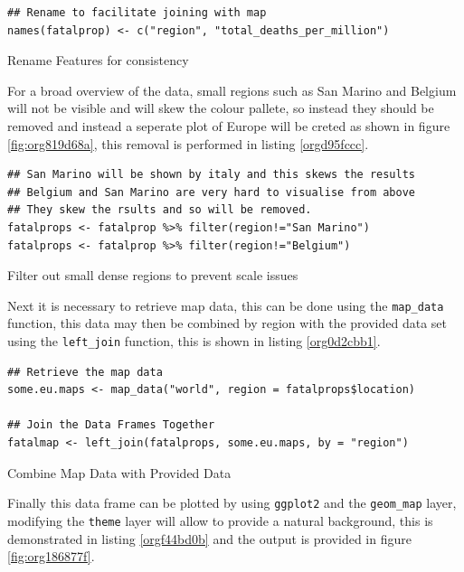 \documentclass[11pt]{article}
\begin{document}
\begin{listing}[htbp]
\begin{verbatim}
## Rename to facilitate joining with map
names(fatalprop) <- c("region", "total_deaths_per_million")
\end{verbatim}
\caption{\label{org26e6ca5}Rename Features for consistency}
\end{listing}

For a broad overview of the data, small regions such as San Marino and Belgium
will not be visible and will skew the colour pallete, so instead they should be removed
and instead a seperate plot of Europe will be creted as shown in figure \ref{fig:org819d68a}, this removal is performed in
listing \ref{orgd95fccc}.

\begin{listing}[htbp]
\begin{verbatim}
## San Marino will be shown by italy and this skews the results
## Belgium and San Marino are very hard to visualise from above
## They skew the rsults and so will be removed.
fatalprops <- fatalprop %>% filter(region!="San Marino")
fatalprops <- fatalprop %>% filter(region!="Belgium")
\end{verbatim}
\caption{\label{orgd95fccc}Filter out small dense regions to prevent scale issues}
\end{listing}


Next it is necessary to retrieve map data, this can be done using the \texttt{map\_data}
function, this data may then be combined by region with the provided data set
using the \texttt{left\_join} function, this is shown in listing \ref{org0d2cbb1}.

\begin{listing}[htbp]
\begin{verbatim}
## Retrieve the map data
some.eu.maps <- map_data("world", region = fatalprops$location)

## Join the Data Frames Together
fatalmap <- left_join(fatalprops, some.eu.maps, by = "region")
\end{verbatim}
\caption{\label{org0d2cbb1}Combine Map Data with Provided Data}
\end{listing}

Finally this data frame can be plotted by using \texttt{ggplot2} and the \texttt{geom\_map}
layer, modifying the \texttt{theme} layer will allow to provide a natural background,
this is demonstrated in listing \ref{orgf44bd0b} and the output is provided in figure \ref{fig:org186877f}.
\end{document}
